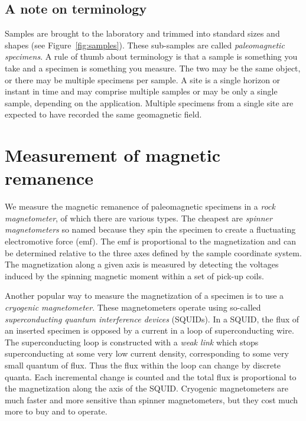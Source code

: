 \subsection {A note on terminology}

Samples are brought to the laboratory
 and trimmed into  standard sizes and shapes (see Figure~\ref{fig:samples}).  These sub-samples are called
{\it paleomagnetic specimens}.  A rule of thumb about terminology is that a sample is something you take and a specimen is something you measure.   The two may be the same object, or there may be multiple specimens per sample.    A site is a single horizon or instant in time and may comprise multiple samples or may be only a single sample, depending on the application.  Multiple specimens from a single site are expected to have recorded the same geomagnetic field.    




\section{Measurement of magnetic remanence}
\label{sect:meas}

     
We measure the magnetic remanence of paleomagnetic specimens in a 
{\it rock magnetometer}, of which there are various types.  The cheapest  are
 {\it spinner magnetometers} so named because
they spin the specimen to create a fluctuating electromotive force 
(emf).  The emf is
proportional to the magnetization and can be determined relative to the three
axes defined by the sample coordinate system.   The magnetization along a
given axis is measured by detecting the voltages induced by the spinning
magnetic moment within a set of pick-up coils.




Another popular way to measure the magnetization of a specimen is to use a
{\it cryogenic magnetometer}.
 These magnetometers operate 
using so-called
 {\it superconducting quantum interference
devices}  (SQUIDs). In a SQUID, 
the  flux of an inserted specimen is opposed by a  
current in a loop of superconducting wire.  
The superconducting loop is constructed with a {\it weak link}
which stops superconducting at some very low current density, corresponding to some very small
quantum of flux.  Thus the flux within the loop can
change by discrete quanta.  Each incremental change is counted and the total
flux is proportional to  the magnetization along the axis of the SQUID.  
Cryogenic magnetometers are much faster and more sensitive than
spinner magnetometers, but they cost much more to buy and to operate.   

